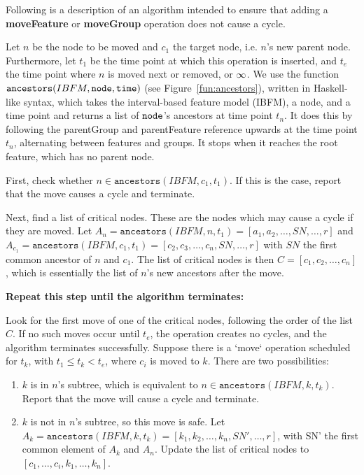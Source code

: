 Following is a description of an algorithm intended to ensure that adding a \textbf{moveFeature} or \textbf{moveGroup} operation does not cause a cycle.

Let $n$ be the node to be moved and $c_1$ the target node, i.e. $n$'s new parent node. Furthermore, let $t_1$ be the time point at which this operation is inserted, and $t_e$ the time point where $n$ is moved next or removed, or $\infty$. We use the function $\texttt{ancestors}(IBFM, \texttt{node}, \texttt{time})$ (see Figure~\ref{fun:ancestors}), written in Haskell-like syntax, which takes the interval-based feature model (IBFM), a node, and a time point and returns a list of $\texttt{node}$'s ancestors at time point $t_n$. It does this by following the parentGroup and parentFeature reference upwards at the time point $t_n$, alternating between features and groups. It stops when it reaches the root feature, which has no parent node.

First, check whether $n \in \texttt{ancestors}(IBFM, c_1, t_1)$. If this is the case, report that the move causes a cycle and terminate. 

Next, find a list of critical nodes. These are the nodes which may cause a cycle if they are moved. 
Let $A_n = \texttt{ancestors}(IBFM, n, t_1) = [a_1, a_2, \dots, SN, \dots, r]$ and $A_{c_1} = \texttt{ancestors}(IBFM, c_1, t_1) = [c_2 \comma c_3 \comma \dots \comma c_n \comma SN \comma \dots \comma r]$ with $SN$ the first common ancestor of $n$ and $c_1$. The list of critical nodes is then $C = [c_1, c_2, \dots, c_n]$, which is essentially the list of $n$'s new ancestors after the move. 

\textbf{Repeat this step until the algorithm terminates:}

Look for the first move of one of the critical nodes, following the order of the list $C$. If no such moves occur until $t_e$, the operation creates no cycles, and the algorithm terminates successfully.  
  Suppose there is a `move` operation scheduled for $t_k$, with $t_1 \leq t_k < t_e$, where $c_i$ is moved to $k$. There are two possibilities:  
  \begin{enumerate}
    \item $k$ is in $n$'s subtree, which is equivalent to $n \in \texttt{ancestors}(IBFM, k, t_k)$. Report that the move will cause a cycle and terminate. 
\item $k$ is not in $n$'s subtree, so this move is safe. Let $A_k = \texttt{ancestors}(IBFM, k, t_k) = [k_1, k_2, \dots, k_n, SN', \dots, r]$, with SN' the first common element of $A_k$ and $A_n$. Update the list of critical nodes to $[c_1, \dots, c_i, k_1, \dots, k_n]$.
  \end{enumerate}

